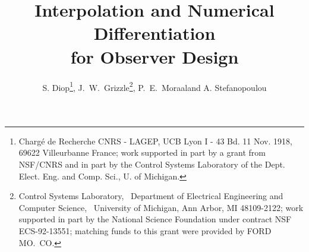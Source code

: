 \def\subsubsection{\@startsection{subsubsection}{3}{\z@}{\sectionspaceb plus .5em
minus .1em}{\qquad}{\underline{\normalsize\bf}}}

\def\caption{\refstepcounter\@captype \@dblarg{\@caption\@captype}}


\long{}

\long{}

\makeatother



\small

\baselineskip=12pt
\parskip=0in


\title{\vspace*{.5cm}
\large\bf Interpolation and Numerical Differentiation \\
for Observer Design}

\author{S. Diop\thanks{Charg\'e de Recherche CNRS - LAGEP, UCB Lyon I - 43 Bd.
11 Nov. 1918, 69622 Villeurbanne France;
work supported in part by a grant from NSF/CNRS and in part 
by the Control Systems Laboratory of
the Dept. Elect. Eng. and Comp. Sci., U. of Michigan.}, 
J.\ W.\ Grizzle\thanks{Control Systems Laboratory, \
Department of Electrical Engineering and Computer
Science, \ University of Michigan, Ann Arbor, MI 48109-2122;
work supported in part by the National Science
Foundation under contract NSF ECS-92-13551; matching funds to this grant were
provided by FORD MO.\ CO.},
P.\ E.\ Moraal\footnotemark[2] and A. Stefanopoulou\footnotemark[2] }



\maketitle


